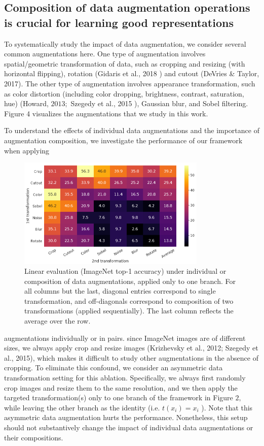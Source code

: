 \documentclass[]{IEEEtran}
\begin{document}
\subsection{Composition of data augmentation operations is crucial for learning good representations }
To systematically study the impact of data augmentation, we consider several common augmentations here. One type of augmentation involves spatial/geometric transformation of data, such as cropping and resizing (with horizontal flipping), rotation (Gidaris et al., 2018 ) and cutout (DeVries \& Taylor, 2017). The other type of augmentation involves appearance transformation, such as color distortion (including color dropping, brightness, contrast, saturation, hue) (Howard, $2013 ;$ Szegedy et al., 2015 ), Gaussian blur, and Sobel filtering. Figure 4 visualizes the augmentations that we study in this work.

To understand the effects of individual data augmentations and the importance of augmentation composition, we investigate the performance of our framework when applying

\begin{figure}[!h]
    \centering
    \includegraphics[width=9cm]{images/fig5.PNG}
    \caption{Linear evaluation (ImageNet top-1 accuracy) under individual or composition of data augmentations, applied only to one branch. For all columns but the last, diagonal entries correspond to single transformation, and off-diagonals correspond to composition of two transformations (applied sequentially). The last column reflects the average over the row.}
    \label{fig5}
\end{figure}

augmentations individually or in pairs. since ImageNet images are of different sizes, we always apply crop and resize images (Krizhevsky et al., 2012; Szegedy et al., 2015), which makes it difficult to study other augmentations in the absence of cropping. To eliminate this confound, we consider an asymmetric data transformation setting for this ablation. Specifically, we always first randomly crop images and resize them to the same resolution, and we then apply the targeted transformation(s) only to one branch of the framework in Figure $2,$ while leaving the other branch as the identity (i.e. $t\left(x_{i}\right)=x_{i}$ ). Note that this asymmetric data augmentation hurts the performance. Nonetheless, this setup should not substantively change the impact of individual data augmentations or their compositions.
\end{document}
